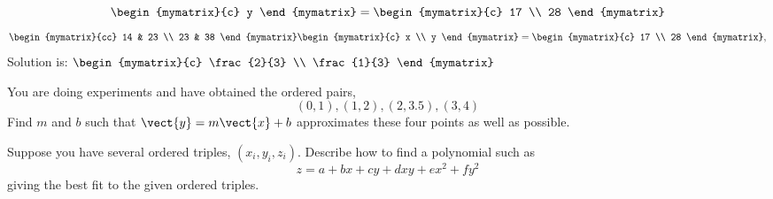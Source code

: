 \begin{enumialphparenastyle}
\begin{ex}
\begin{sol}
\[\begin{mymatrix}{c}
y
\end{mymatrix} =\begin{mymatrix}{c}
17 \\
28
\end{mymatrix}
\]
\[
\begin{mymatrix}{cc}
14 & 23 \\
23 & 38
\end{mymatrix} \begin{mymatrix}{c}
x \\
y
\end{mymatrix} =\begin{mymatrix}{c}
17 \\
28
\end{mymatrix} ,
\]
Solution is: $\begin{mymatrix}{c}
\frac{2}{3} \\
\frac{1}{3}
\end{mymatrix}$
\end{sol}
\end{ex}

\begin{ex}
 You are doing experiments and have obtained the ordered pairs, 
\begin{equation*}
(0,1) ,(1,2) ,(2,3.5) ,(3,4)
\end{equation*}
Find $m$ and $b$ such that $\vect{y}=m\vect{x}+b$ approximates these four points as well
as possible. 
\end{ex}

\begin{ex}
Suppose you have several ordered triples, $(
x_{i},y_{i},z_{i})$. Describe how to find a polynomial such as  
\begin{equation*}
z=a+bx+cy+dxy+ex^{2}+fy^{2}
\end{equation*}
 giving the best fit to the given ordered triples.
\end{ex}

\end{enumialphparenastyle}